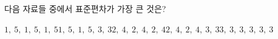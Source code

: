 다음 자료들 중에서 표준편차가 가장 큰 것은?
\begin{choicesii}{$1,\ 5,\ 1,\ 5,\ 1,\ 5$}{$1,\ 5,\ 1,\ 5,\ 3,\ 3$}{$2,\ 4,\ 2,\ 4,\ 2,\ 4$}{$2,\ 4,\ 2,\ 4,\ 3,\ 3$}{$3,\ 3,\ 3,\ 3,\ 3,\ 3$}\end{choicesii}
